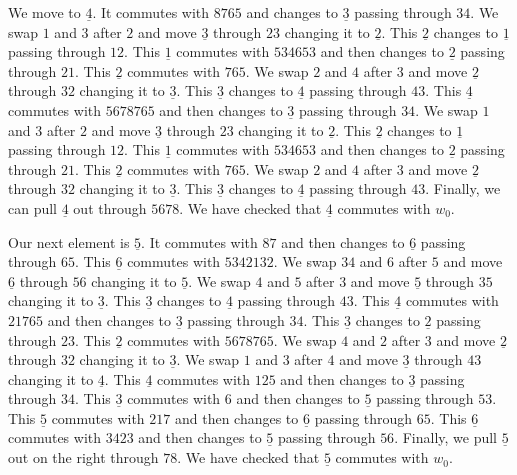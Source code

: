 \documentclass[a4paper]{amsart}
\begin{document}
We move to  $\underline{4}$. It commutes with $8765$
and changes to  $\underline{3}$  passing through $34$.
We swap $1$ and $3$ after $2$ and move 
$\underline{3}$  through $23$ changing it to  $\underline{2}$.
This $\underline{2}$ changes to $\underline{1}$ passing through
$12$. This $\underline{1}$ commutes with $534653$
and then changes to $\underline{2}$ passing through
$21$. This $\underline{2}$ commutes with $765$.
We swap $2$ and $4$ after $3$ and move 
$\underline{2}$  through $32$ changing it to  $\underline{3}$.
This $\underline{3}$ changes to $\underline{4}$ passing through
$43$. This $\underline{4}$ commutes with $5678765$
and then changes to $\underline{3}$ passing through $34$. 
We swap $1$ and $3$ after $2$ and move 
$\underline{3}$  through $23$ changing it to  $\underline{2}$.
This $\underline{2}$ changes to $\underline{1}$ passing through
$12$. This $\underline{1}$ commutes with $534653$
and then changes to $\underline{2}$ passing through $21$. 
This $\underline{2}$ commutes with $765$.
We swap $2$ and $4$ after $3$ and move 
$\underline{2}$  through $32$ changing it to  $\underline{3}$.
This $\underline{3}$ changes to $\underline{4}$ passing through
$43$. Finally, we can pull $\underline{4}$ out through
$5678$. We have checked that 
$\underline{4}$ commutes with $w_0$.

Our next element is  $\underline{5}$. It commutes with $87$
and then changes to $\underline{6}$ passing through $65$. 
This $\underline{6}$ commutes with $5342132$.
We swap $34$ and $6$ after $5$ and move 
$\underline{6}$  through $56$ changing it to  $\underline{5}$.
We swap $4$ and $5$ after $3$ and move 
$\underline{5}$  through $35$ changing it to  $\underline{3}$.
This $\underline{3}$ changes to $\underline{4}$ passing through
$43$. This $\underline{4}$ commutes with $21765$
and then changes to $\underline{3}$ passing through
$34$. This $\underline{3}$ changes to $\underline{2}$ passing through
$23$. This $\underline{2}$ commutes with $5678765$.
We swap $4$ and $2$ after $3$ and move 
$\underline{2}$  through $32$ changing it to  $\underline{3}$.
We swap $1$ and $3$ after $4$ and move 
$\underline{3}$  through $43$ changing it to  $\underline{4}$.
This $\underline{4}$ commutes with $125$
and then changes to $\underline{3}$ passing through
$34$. This $\underline{3}$ commutes with $6$
and then changes to $\underline{5}$ passing through
$53$. This $\underline{5}$ commutes with $217$
and then changes to $\underline{6}$ passing through
$65$. This $\underline{6}$ commutes with $3423$
and then changes to $\underline{5}$ passing through
$56$. Finally, we pull $\underline{5}$ out on the right
through $78$. We have checked that 
$\underline{5}$ commutes with $w_0$.
\end{document}
